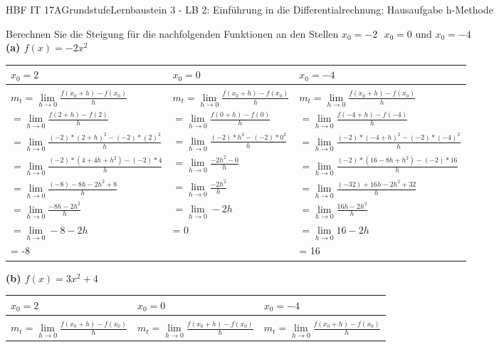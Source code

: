 \documentclass[oneside,openany,headings=optiontotoc,11pt,numbers=noenddot]{scrreprt}
\begin{document}
	\begin{worksheet}{HBF IT 17A}{Grundstufe}{Lernbaustein 3 - LB 2: Einführung in die Differentialrechnung: Hausaufgabe h-Methode}

		\begin{framed}
			\noindent
			\normalsize
			Berechnen Sie die Steigung für die nachfolgenden Funktionen an den Stellen \(x_0 = -2 \text{ }x_0=0 \text{ und } x_0=-4\)\\
			\textbf{(a) \(f(x) = -2x^{2}\)}\\
			\begin{tabularx}{\textwidth}{X|X|X}
				\(x_0 = 2\) & \(x_0 = 0\) & \(x_0=-4\)\\
				\hline
				\\
				\(m_{t} = \lim\limits_{h \to 0} \frac{f(x_{0}+h) - f(x_0)}{h}\) & \(m_{t} = \lim\limits_{h \to 0} \frac{f(x_{0}+h) - f(x_0)}{h}\) & \(m_{t} = \lim\limits_{h \to 0} \frac{f(x_{0}+h) - f(x_0)}{h}\)\\
				\(=\lim\limits_{h \to 0} \frac{f(2+h)-f(2)}{h}\) & \(=\lim\limits_{h \to 0} \frac{f(0+h)-f(0)}{h}\) & \(=\lim\limits_{h \to 0} \frac{f(-4+h)-f(-4)}{h}\)\\
				\(=\lim\limits_{h \to 0} \frac{(-2)*(2+h)^2 - (-2)*(2)^2}{h}\) & \(=\lim\limits_{h \to 0} \frac{(-2)*h^2 - (-2)*0^2}{h}\) & \(=\lim\limits_{h \to 0} \frac{(-2)*(-4+h)^2 - (-2)*(-4)^2}{h}\)\\
				\(=\lim\limits_{h \to 0} \frac{(-2)*(4 +4h+h^2) -(-2)*4}{h}\) & \(=\lim\limits_{h \to 0} \frac{-2h^2 - 0}{h}\) & \(=\lim\limits_{h \to 0} \frac{(-2)*(16-8h+h^2) -(-2)*16}{h}\)\\
				\(=\lim\limits_{h \to 0}\frac{(-8)-8h-2h^2 +8}{h}\) & \(=\lim\limits_{h \to 0}\frac{-2h^2}{h}\) & \(=\lim\limits_{h \to 0}\frac{(-32)+16h-2h^2 +32}{h}\)\\
				\(=\lim\limits_{h \to 0} \frac{-8h -2h^2}{h}\) & \(=\lim\limits_{h \to 0}-2h\) & \(=\lim\limits_{h \to 0} \frac{16h -2h^2}{h}\)\\
				\(=\lim\limits_{h \to 0} -8 -2h\) & = 0 & \(=\lim\limits_{h \to 0} 16 -2h\)\\
				= -8 & & = 16
			\end{tabularx}
			\textbf{(b) \(f(x) = 3x^2 + 4\)}\\
			\begin{tabularx}{\textwidth}{X|X|X}
				\(x_0 = 2\) & \(x_0 = 0\) & \(x_0=-4\)\\
				\hline
				\\
				\(m_{t} = \lim\limits_{h \to 0} \frac{f(x_{0}+h) - f(x_0)}{h}\) & \(m_{t} = \lim\limits_{h \to 0} \frac{f(x_{0}+h) - f(x_0)}{h}\) & \(m_{t} = \lim\limits_{h \to 0} \frac{f(x_{0}+h) - f(x_0)}{h}\)\\

\end{tabularx}
\end{framed}
\end{worksheet}
\end{document}
